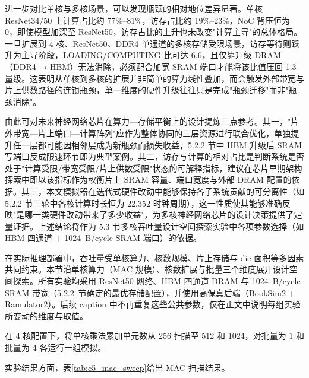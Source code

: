 进一步对比单核与多核场景，可以发现瓶颈的相对地位差异显著。单核 ResNet34/50 上计算占比约 77\%--81\%，访存占比约 19\%--23\%，NoC 背压恒为 0，即使模型加深至 ResNet50，访存占比的上升也未改变"计算主导"的总体格局。一旦扩展到 4 核、ResNet50、DDR4 单通道的多核存储受限场景，访存等待则跃升为主导阶段，LOADING\allowbreak /COMPUTING \allowbreak 比可达 6.6，且仅靠升级 DRAM（DDR4 → HBM）无法消除，必须配合加宽 SRAM 端口才能将该比值压回 1.3 量级。这表明从单核到多核的扩展并非简单的算力线性叠加，而会触发外部带宽与片上供数路径的连锁瓶颈，单一维度的硬件升级往往只是完成"瓶颈迁移"而非"瓶颈消除"。

由此可对未来神经网络芯片在算力—存储平衡上的设计提炼三点参考。其一，"片外带宽—片上端口—计算阵列"应作为整体协同的三层资源进行联合优化，单独提升任一层都可能因相邻层成为新瓶颈而损失收益，5.2.2 节中 HBM 升级后 SRAM 写端口反成限速环节即为典型案例。其二，访存与计算的相对占比是判断系统是否处于"计算受限/带宽受限/片上供数受限"状态的可解释指标，建议在芯片早期架构探索中即以该指标作为权衡片上 SRAM 容量、端口宽度与外部 DRAM 配置的依据。其三，本文模拟器在迭代式硬件改动中能够保持各子系统贡献的可分离性（如 5.2.2 节三轮中各核计算时长恒为 22,352 时钟周期），这一性质使其能够准确反映"是哪一类硬件改动带来了多少收益"，为多核神经网络芯片的设计决策提供了定量证据。上述结论将作为 5.3 节多核吞吐量设计空间探索实验中各项参数选择（如 HBM 四通道 + \SI{1024}{B/cycle} SRAM 端口）的依据。

\label{sec:c5_dse}

在实际推理部署中，吞吐量受单核算力、核数规模、片上存储与 die 面积等多因素共同约束。本节沿单核算力（MAC 规模）、核数扩展与批量三个维度展开设计空间探索。所有实验均采用 ResNet50 网络、HBM 四通道 DRAM 与 \SI{1024}{B/cycle} SRAM 带宽（5.2.2~节确定的最优存储配置），并使用高保真后端（BookSim2 + Ramulator2）。后续 caption 中不再重复这些公共参数，仅在正文中说明每组实验所变动的维度与取值。


在 4 核配置下，将单核乘法累加单元数从 256 扫描至 512 和 1024，对批量为 1 和批量为 4 各运行一组模拟。

实验结果方面，表\ref{tab:c5_mac_sweep}给出 MAC 扫描结果。

